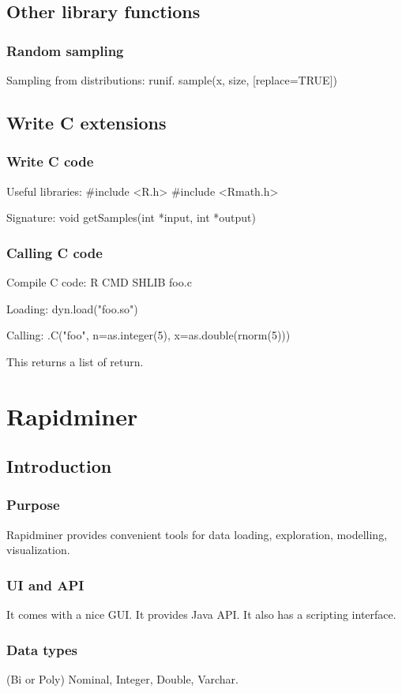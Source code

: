 \section{Other library functions}
\subsection{Random sampling}
Sampling from distributions: runif. sample(x, size, [replace=TRUE])

\section{Write C extensions}
\subsection{Write C code}
Useful libraries: \#include <R.h> \#include <Rmath.h>

Signature: void getSamples(int *input, int *output)

\subsection{Calling C code}
Compile C code: R CMD SHLIB foo.c

Loading: dyn.load("foo.so")

Calling: .C("foo", n=as.integer(5), x=as.double(rnorm(5)))

This returns a list of return.

\chapter{Rapidminer}
\section{Introduction}
\subsection{Purpose}
Rapidminer provides convenient tools for data loading, exploration, modelling, visualization.

\subsection{UI and API}
It comes with a nice GUI. It provides Java API. It also has a scripting interface.

\subsection{Data types}
(Bi or Poly) Nominal, Integer, Double, Varchar.

